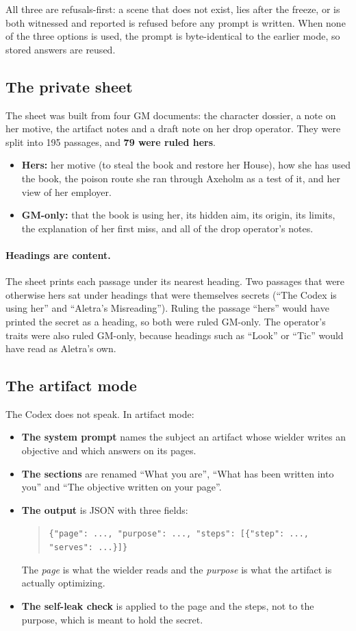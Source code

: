 \documentclass[11pt]{article}
\newcommand{\code}[1]{\texttt{#1}}
\begin{document}
All three are refusals-first: a scene that does not exist, lies after the freeze, or is both
witnessed and reported is refused before any prompt is written. When none of the three
options is used, the prompt is byte-identical to the earlier mode, so stored answers are
reused.

\subsection{The private sheet}

The sheet was built from four GM documents: the character dossier, a note on her motive,
the artifact notes and a draft note on her drop operator. They were split into 195
passages, and \textbf{79 were ruled hers}.
\begin{itemize}[nosep]
\item \textbf{Hers:} her motive (to steal the book and restore her House), how she has used
the book, the poison route she ran through Axeholm as a test of it, and her view of her
employer.
\item \textbf{GM-only:} that the book is using her, its hidden aim, its origin, its limits,
the explanation of her first miss, and all of the drop operator's notes.
\end{itemize}

\paragraph{Headings are content.} The sheet prints each passage under its nearest heading.
Two passages that were otherwise hers sat under headings that were themselves secrets
(``The Codex is using her'' and ``Aletra's Misreading''). Ruling the passage ``hers'' would
have printed the secret as a heading, so both were ruled GM-only. The operator's traits
were also ruled GM-only, because headings such as ``Look'' or ``Tic'' would have read as
Aletra's own.

\subsection{The artifact mode}
\label{sec:artifact}

The Codex does not speak. In artifact mode:
\begin{itemize}[nosep]
\item \textbf{The system prompt} names the subject an artifact whose wielder writes an
objective and which answers on its pages.
\item \textbf{The sections} are renamed ``What you are'', ``What has been written into
you'' and ``The objective written on your page''.
\item \textbf{The output} is JSON with three fields:
\begin{quote}\small
\code{\{"page": ..., "purpose": ..., "steps": [\{"step": ..., "serves": ...\}]\}}
\end{quote}
The \emph{page} is what the wielder reads and the \emph{purpose} is what the artifact is
actually optimizing.
\item \textbf{The self-leak check} is applied to the page and the steps, not to the
purpose, which is meant to hold the secret.
\end{itemize}
\end{document}
